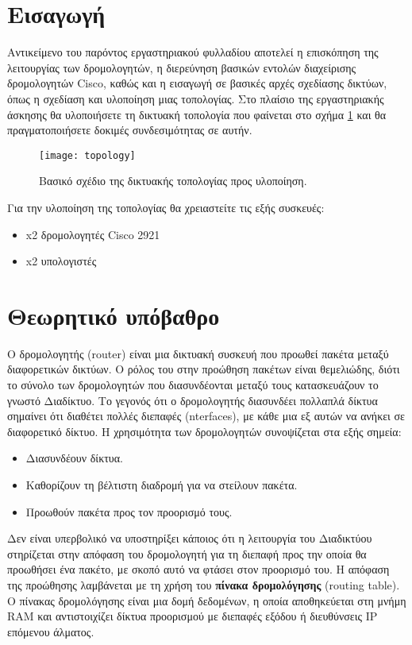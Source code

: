 \documentclass{EdipyLabs} %
\begin{document}
\Initialize

\section*{Εισαγωγή}
Αντικείμενο του παρόντος εργαστηριακού φυλλαδίου αποτελεί η επισκόπηση της λειτουργίας των δρομολογητών, η διερεύνηση βασικών εντολών διαχείρισης δρομολογητών Cisco, καθώς και η εισαγωγή σε βασικές αρχές σχεδίασης δικτύων, όπως η σχεδίαση και υλοποίηση μιας τοπολογίας. Στο πλαίσιο της εργαστηριακής άσκησης θα υλοποιήσετε τη δικτυακή τοπολογία που φαίνεται στο σχήμα \ref{topology1} και θα πραγματοποιήσετε δοκιμές συνδεσιμότητας σε αυτήν.

\begin{figure}[H]
	\centering
	\texttt{[image: topology]}
	\caption{Βασικό σχέδιο της δικτυακής τοπολογίας προς υλοποίηση.}\label{topology1}
\end{figure}

Για την υλοποίηση της τοπολογίας θα χρειαστείτε τις εξής συσκευές:
\begin{itemize}
	\item x2 δρομολογητές Cisco 2921
	\item x2 υπολογιστές
\end{itemize}

\section{Θεωρητικό υπόβαθρο}

Ο δρομολογητής (router) είναι μια δικτυακή συσκευή που προωθεί πακέτα μεταξύ διαφορετικών δικτύων. Ο ρόλος του στην προώθηση πακέτων είναι θεμελιώδης, διότι το σύνολο των δρομολογητών που διασυνδέονται μεταξύ τους κατασκευάζουν το γνωστό Διαδίκτυο. Το γεγονός ότι ο δρομολογητής διασυνδέει πολλαπλά δίκτυα σημαίνει ότι διαθέτει πολλές διεπαφές (nterfaces), με κάθε μια εξ αυτών να ανήκει σε διαφορετικό δίκτυο. Η χρησιμότητα των δρομολογητών συνοψίζεται στα εξής σημεία:
\begin{itemize}
	\item Διασυνδέουν δίκτυα.
	\item Καθορίζουν τη βέλτιστη διαδρομή για να στείλουν πακέτα.
	\item Προωθούν πακέτα προς τον προορισμό τους.
\end{itemize}

Δεν είναι υπερβολικό να υποστηρίξει κάποιος ότι η λειτουργία του Διαδικτύου στηρίζεται στην απόφαση του δρομολογητή για τη διεπαφή προς την οποία θα προωθήσει ένα πακέτο, με σκοπό αυτό να φτάσει στον προορισμό του. Η απόφαση της προώθησης λαμβάνεται με τη χρήση του \textbf{πίνακα δρομολόγησης} (routing table). Ο πίνακας δρομολόγησης είναι μια δομή δεδομένων, η οποία αποθηκεύεται στη μνήμη RAM και αντιστοιχίζει δίκτυα προορισμού με διεπαφές εξόδου ή διευθύνσεις IP επόμενου άλματος.
\end{document}
